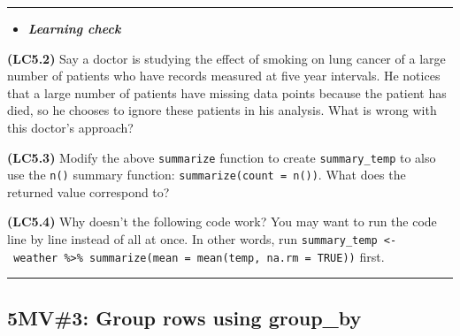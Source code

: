 \documentclass[]{tufte-book}
\newenvironment{Shaded}{\begin{snugshade}}{\end{snugshade}}
\newcommand{\KeywordTok}[1]{\textcolor[rgb]{0.13,0.29,0.53}{\textbf{{#1}}}}
\newcommand{\DataTypeTok}[1]{\textcolor[rgb]{0.13,0.29,0.53}{{#1}}}
\newcommand{\StringTok}[1]{\textcolor[rgb]{0.31,0.60,0.02}{{#1}}}
\newcommand{\OtherTok}[1]{\textcolor[rgb]{0.56,0.35,0.01}{{#1}}}
\newcommand{\NormalTok}[1]{{#1}}
\let\oldrule=\rule
\renewcommand{\rule}[1]{\oldrule{\linewidth}}
\newenvironment{rmdblock}[1]
  {\begin{shaded*}
  \begin{itemize}
  \renewcommand{\labelitemi}{
    \raisebox{-.7\height}[0pt][0pt]{
    }
  }
  \item
  }
  {
  \end{itemize}
  \end{shaded*}
  }
\newenvironment{learncheck}
  {\begin{rmdblock}{warning}}
  {\end{rmdblock}}
\begin{document}
\begin{center}\rule{0.5\linewidth}{\linethickness}\end{center}

\begin{learncheck}
\textbf{\emph{Learning check}}
\end{learncheck}

\textbf{(LC5.2)} Say a doctor is studying the effect of smoking on lung
cancer of a large number of patients who have records measured at five
year intervals. He notices that a large number of patients have missing
data points because the patient has died, so he chooses to ignore these
patients in his analysis. What is wrong with this doctor's approach?

\textbf{(LC5.3)} Modify the above \texttt{summarize} function to create
\texttt{summary\_temp} to also use the \texttt{n()} summary function:
\texttt{summarize(count\ =\ n())}. What does the returned value
correspond to?

\textbf{(LC5.4)} Why doesn't the following code work? You may want to
run the code line by line instead of all at once. In other words, run
\texttt{summary\_temp\ \textless{}-\ weather\ \%\textgreater{}\%\ summarize(mean\ =\ mean(temp,\ na.rm\ =\ TRUE))}
first.

\begin{Shaded}
\end{Shaded}

\begin{center}\rule{0.5\linewidth}{\linethickness}\end{center}

\subsection{5MV\#3: Group rows using
group\_by}\label{mv3-group-rows-using-group_by}
\end{document}

